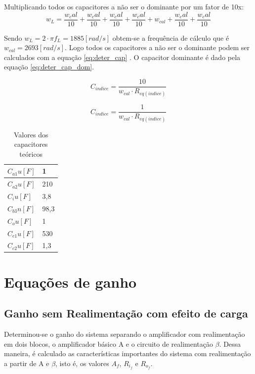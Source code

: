 \documentclass[openright]{normas-utf-tex} %
\begin{document}
Multiplicando todos os capacitores a não ser o dominante por um fator de 10x:
\begin{equation}
w_L = \frac{w_cal}{10}+\frac{w_cal}{10}+\frac{w_cal}{10}+\frac{w_cal}{10}+ w_{cal} +\frac{w_cal}{10} +\frac{w_cal}{10}
\end{equation}

Sendo $w_L = 2 \cdot \pi f_L = 1885 [rad/s]$ obtem-se a frequência de cálculo que é $w_{cal} = 2693 [rad/s]$. Logo todos os capacitores a não ser o dominante podem ser calculados com a equação \ref{eq:deter_cap} . O capacitor dominante é dado pela equação \ref{eq:deter_cap_dom}.

\begin{equation}\label{eq:deter_cap}
C_{indice} = \frac{10}{w_{cal} \cdot R_{eq\left(indice\right)}}
\end{equation}


\begin{equation}\label{eq:deter_cap_dom}
C_{indice} = \frac{1}{w_{cal} \cdot R_{eq\left(indice\right)}}
\end{equation}

\begin{table}[H]
\centering
\caption{Valores dos capacitores teóricos}
\label{tab:capacitores}
\begin{tabular}{|l|l|}
\hline
$C_{a1} u[F]$ & 1    \\ \hline
$C_{a2} u[F]$ & 210  \\ \hline
$C_{i} u[F]$  & 3,8  \\ \hline
$C_{b3} n[F]$ & 98,3 \\ \hline
$C_{o} u[F]$  & 1    \\ \hline
$C_{e1} u[F]$ & 530  \\ \hline
$C_{c2} u[F]$ & 1,3  \\ \hline
\end{tabular}
\end{table}



\section{Equações de ganho}
\label{sec:eq_ganho}

\subsection{Ganho sem Realimentação com efeito de carga}
\label{subsec:sem_real}
Determinou-se o ganho do sistema separando o amplificador com realimentação em dois blocos, o amplificador básico A e o circuito de realimentação $\beta$. Dessa maneira, é calculado as características importantes do sistema com realimentação a partir de A e $\beta$, isto é, os valores $A_f$, $R_{i_f}$ e $R_{o_f}$. 
\end{document}
